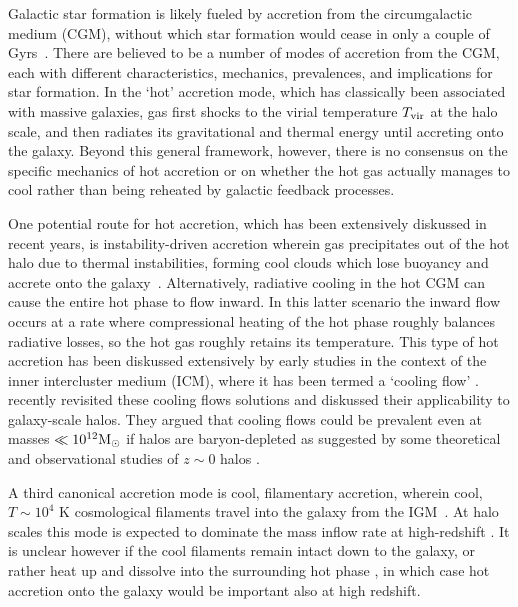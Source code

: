 \documentclass[fleqn,usenatbib]{mnras}
\newcommand{\Tvir}{T_{\rm vir}}
\newcommand{\msun}{{\rm M}_\odot}
\begin{document}
Galactic star formation is likely fueled by accretion from the circumgalactic medium (CGM), without which star formation would cease in only a couple of Gyrs~\cite[e.g.][]{Prochaska2009, Bauermeister2010, Spring2017}.
There are believed to be a number of modes of accretion from the CGM, each with different characteristics, mechanics, prevalences, and implications for star formation.
In the `hot' accretion mode, which has classically been associated with massive galaxies, gas first shocks to the virial temperature $\Tvir$ at the halo scale, and then radiates its gravitational and thermal energy until accreting onto the galaxy. Beyond this general framework, however, there is no consensus on the specific mechanics of hot accretion or on whether the hot gas actually manages to cool rather than being reheated by galactic feedback processes. 

One potential route for hot accretion, which has been extensively diskussed in recent years, is instability-driven accretion wherein gas precipitates out of the hot halo due to thermal instabilities, forming cool clouds which lose buoyancy and accrete onto the galaxy~\citep[e.g.][]{Maller2004, Mccourt2012, Voit2015, Armillotta2016, Gronke2019a, Voit2021}.
Alternatively, radiative cooling in the hot CGM can cause the entire hot phase to flow inward.
In this latter scenario the inward flow occurs at a rate where compressional heating of the hot phase roughly balances radiative losses, so the hot gas roughly retains its temperature.
This type of hot accretion has been diskussed extensively by early studies in the context of the inner intercluster medium (ICM), where it has been termed a `cooling flow' \citep[][see \citealt{McNamara2007} for a review]{Mathews78, Cowie80, Fabian84, balbus88, Bertschinger1989}. \cite{Stern2019, Stern2020a} recently revisited these cooling flows solutions and diskussed  their applicability to galaxy-scale halos.
They argued that cooling flows could be prevalent even at masses $\ll10^{12}\msun$ if halos are baryon-depleted as suggested by some theoretical and observational studies of $z\sim0$ halos \citep[e.g.,][]{Bregman2018, Hafen2019}. 

A third canonical accretion mode is cool, filamentary accretion, wherein cool, $T \sim 10^4$ K cosmological filaments travel into the galaxy from the IGM~\cite[e.g.][]{Keres2005, Dekel2006, Keres2009, Martin2019a}. At halo scales this mode is expected to dominate the mass inflow rate at high-redshift \citep[$z\gtrsim2$, e.g.][]{Keres2009a, Dekel2009, Huscher2020}. It is unclear however if the cool filaments remain intact down to the galaxy, or rather heat up and dissolve into the surrounding hot phase \citep{Nelson2016, Mandelker+}, in which case hot accretion onto the galaxy would be important also at high redshift. 
\end{document}

